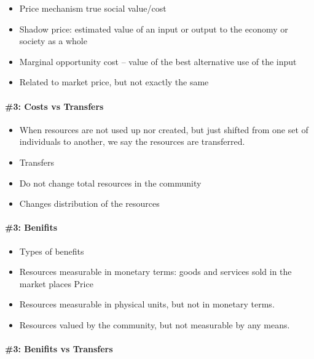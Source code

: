 \documentclass[]{article}
\providecommand{\tightlist}{%
  \setlength{\itemsep}{0pt}\setlength{\parskip}{0pt}}
\let\oldparagraph\paragraph
\renewcommand{\paragraph}[1]{\oldparagraph{#1}\mbox{}}
\begin{document}
\begin{itemize}
\tightlist
\item
  Price mechanism true social value/cost
\item
  Shadow price: estimated value of an input or output to the economy or
  society as a whole
\item
  Marginal opportunity cost -- value of the best alternative use of the
  input
\item
  Related to market price, but not exactly the same
\end{itemize}

\hypertarget{costs-vs-transfers}{%
\paragraph{\#3: Costs vs Transfers}\label{costs-vs-transfers}}

\begin{itemize}
\tightlist
\item
  When resources are not used up nor created, but just shifted from one
  set of individuals to another, we say the resources are transferred.
\item
  Transfers
\item
  Do not change total resources in the community
\item
  Changes distribution of the resources
\end{itemize}

\hypertarget{benifits}{%
\paragraph{\#3: Benifits}\label{benifits}}

\begin{itemize}
\tightlist
\item
  Types of benefits
\item
  Resources measurable in monetary terms: goods and services sold in the
  market places Price
\item
  Resources measurable in physical units, but not in monetary terms.
\item
  Resources valued by the community, but not measurable by any means.
\end{itemize}

\hypertarget{benifits-vs-transfers}{%
\paragraph{\#3: Benifits vs Transfers}\label{benifits-vs-transfers}}
\end{document}
